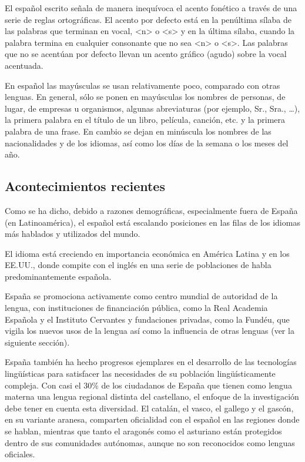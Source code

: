 \begin{multicols}{2}
El español escrito señala  de manera inequívoca el acento fonético a través de una serie de reglas ortográficas. El acento por defecto está en la penúltima sílaba de las palabras que terminan en vocal, <n> o <s> y en la última sílaba, cuando la palabra termina en cualquier consonante que no sea <n> o <s>. Las palabras que no se acentúan por defecto llevan un acento gráfico (agudo) sobre la vocal acentuada.

En español las mayúsculas se usan relativamente poco, comparado con otras lenguas. En general, sólo se ponen en mayúsculas los nombres de personas, de lugar, de empresas u organismos, algunas abreviaturas (por ejemplo, Sr., Sra., \ldots), la primera palabra en el título de un libro, película, canción, etc. y la primera palabra de una frase. En cambio se dejan en minúscula los nombres de las nacionalidades  y de los idiomas, así como los días de la semana o los meses del año.


\subsection{Acontecimientos recientes}

Como se ha dicho, debido a razones demográficas, especialmente fuera de España (en Latinoamérica), el español está escalando posiciones en las filas de los idiomas más hablados y utilizados del mundo.

El idioma está creciendo en importancia económica en América Latina y en los EE.UU., donde compite con el inglés en una serie de poblaciones de habla predominantemente española.

España se promociona activamente como centro mundial de autoridad de la lengua, con instituciones de financiación pública, como la Real Academia Española y el Instituto Cervantes y fundaciones privadas, como la Fundéu, que vigila los nuevos usos de la lengua así como la influencia de otras lenguas (ver la siguiente sección).

España también ha hecho progresos ejemplares en el desarrollo de las tecnologías lingüísticas para satisfacer las necesidades de su población lingüísticamente compleja. Con casi el 30\% de los ciudadanos de España que tienen como lengua materna una lengua regional distinta del castellano, el enfoque de la investigación debe tener en cuenta esta diversidad. El catalán, el vasco, el gallego y el gascón, en su variante aranesa, comparten oficialidad con el español en las regiones donde se hablan, mientras que tanto el aragonés como el asturiano están protegidos dentro de sus comunidades autónomas, aunque no son reconocidos como lenguas oficiales.


\end{multicols}
